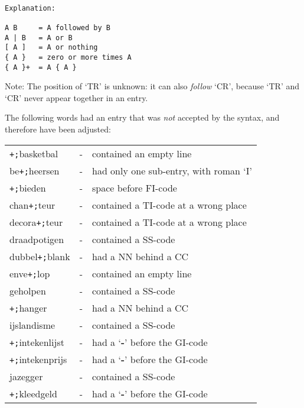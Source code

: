 \begin{verbatim}

Explanation:

A B     = A followed by B
A | B   = A or B
[ A ]   = A or nothing
{ A }   = zero or more times A
{ A }+  = A { A }

\end{verbatim}

Note: The position of `TR' is unknown: it can also {\em follow} `CR', 
because `TR' and `CR' never appear together in an entry.

The following words had an entry that was {\em not} accepted by the syntax,
and therefore have been adjusted:

\begin{table}[htb]
\begin{tabular}{lcl}
{\tt +;}basketbal        &-& contained an empty line \\
be{\tt +;}heersen        &-& had only one sub-entry, with roman `I' \\
{\tt +;}bieden           &-& space before FI-code \\

chan{\tt +;}teur         &-& contained a TI-code at a wrong place \\

decora{\tt +;}teur       &-& contained a TI-code at a wrong place \\
draadpotigen       &-& contained a SS-code \\
dubbel{\tt +;}blank      &-& had a NN behind a CC \\

enve{\tt +;}lop          &-& contained an empty line \\

geholpen           &-& contained a SS-code \\

{\tt +;}hanger           &-& had a NN behind a CC \\

ijslandisme        &-& contained a SS-code \\
{\tt +;}intekenlijst     &-& had a `{\bf -}' before the GI-code \\
{\tt +;}intekenprijs     &-& had a `{\bf -}' before the GI-code \\

jazegger           &-& contained a SS-code \\

{\tt +;}kleedgeld        &-& had a `{\bf -}' before the GI-code \\


\end{tabular}
\end{table}
